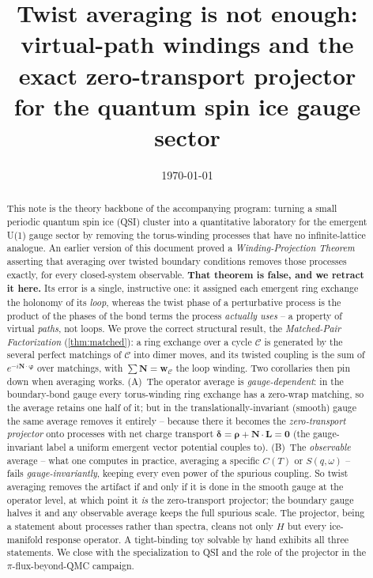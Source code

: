 \documentclass[11pt,letterpaper]{article}
\title{Twist averaging is not enough:\\
virtual-path windings and the exact zero-transport projector\\
for the quantum spin ice gauge sector}
\author{}
\date{\today}
\newcommand{\bvarphi}{\bm{\varphi}}
\newcommand{\bw}{\mathbf{w}}
\newcommand{\bN}{\mathbf{N}}
\newcommand{\bL}{\mathbf{L}}
\newcommand{\brho}{\bm{\rho}}
\newcommand{\bdelta}{\bm{\delta}}
\theoremstyle{plain}
\theoremstyle{definition}
\begin{document}
\maketitle

\begin{abstract}
This note is the theory backbone of the accompanying program: turning a
small periodic quantum spin ice (QSI) cluster into a quantitative
laboratory for the emergent U(1) gauge sector by removing the
torus-winding processes that have no infinite-lattice analogue. An
earlier version of this document proved a \emph{Winding-Projection
Theorem} asserting that averaging over twisted boundary conditions
removes those processes exactly, for every closed-system observable.
\textbf{That theorem is false, and we retract it here.} Its error is a
single, instructive one: it assigned each emergent ring exchange the
holonomy of its \emph{loop}, whereas the twist phase of a perturbative
process is the product of the phases of the bond terms the process
\emph{actually uses} -- a property of virtual \emph{paths}, not loops.
We prove the correct structural result, the \emph{Matched-Pair
Factorization} (\cref{thm:matched}): a ring exchange over a cycle
$\mathcal C$ is generated by the several perfect matchings of
$\mathcal C$ into dimer moves, and its twisted coupling is the sum of
$e^{-i\bN\cdot\bvarphi}$ over matchings, with $\sum\bN=\bw_{\mathcal C}$
the loop winding. Two corollaries then pin down when averaging works. (A)~The operator
average is \emph{gauge-dependent}: in the boundary-bond gauge every
torus-winding ring exchange has a zero-wrap matching, so the average
retains one half of it; but in the translationally-invariant (smooth)
gauge the same average removes it entirely -- because there it becomes
the \emph{zero-transport projector} onto processes with net charge
transport $\bdelta=\brho+\bN\cdot\bL=\bm0$ (the gauge-invariant label a
uniform emergent vector potential couples to). (B)~The \emph{observable}
average -- what one computes in practice, averaging a specific $C(T)$ or
$S(q,\omega)$ -- fails \emph{gauge-invariantly}, keeping every even power
of the spurious coupling. So twist averaging removes the artifact if and
only if it is done in the smooth gauge at the operator level, at which
point it \emph{is} the zero-transport projector; the boundary gauge
halves it and any observable average keeps the full spurious scale. The
projector, being a statement about processes rather than spectra, cleans
not only $H$ but every ice-manifold response operator. A tight-binding toy solvable by hand
exhibits all three statements. We close with the specialization to QSI
and the role of the projector in the $\pi$-flux-beyond-QMC campaign.
\end{abstract}
\end{document}
